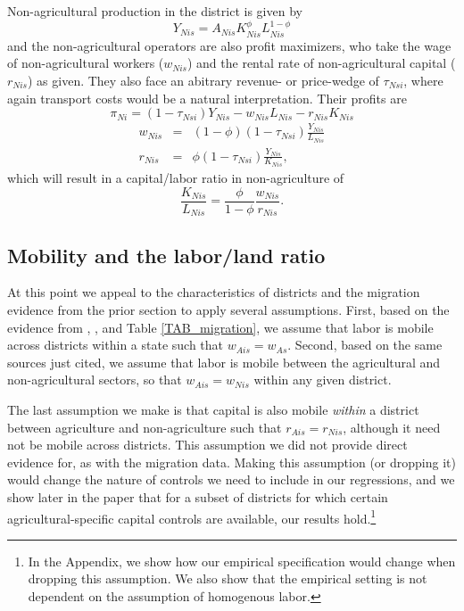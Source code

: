 \documentclass[11pt]{article}
\begin{document}
Non-agricultural production in the district is given by
\begin{equation}
	Y_{Nis} = A_{Nis} K_{Nis}^{\phi}L_{Nis}^{1-\phi} \label{EQ_nonag}
\end{equation}
and the non-agricultural operators are also profit maximizers, who take the wage of non-agricultural workers ($w_{Nis}$) and the rental rate of non-agricultural capital ($r_{Nis}$) as given. They also face an abitrary revenue- or price-wedge of $\tau_{Nsi}$, where again transport costs would be a natural interpretation. Their profits are
\begin{equation}
	\pi_{Ni} = (1-\tau_{Nsi}) Y_{Nis} - w_{Nis} L_{Nis} - r_{Nis} K_{Nis}
\end{equation}
\begin{eqnarray*}
    w_{Nis} &=& (1-\phi)(1-\tau_{Nsi}) \frac{Y_{Nis}}{L_{Nis}} \\ 
    r_{Nis} &=& \phi (1-\tau_{Nsi}) \frac{Y_{Nis}}{K_{Nis}},
\end{eqnarray*}
which will result in a capital/labor ratio in non-agriculture of
\begin{equation}
	\frac{K_{Nis}}{L_{Nis}} = \frac{\phi}{1-\phi} \frac{w_{Nis}}{r_{Nis}}. \label{EQ_KLnon}
\end{equation}

\subsection{Mobility and the labor/land ratio}
At this point we appeal to the characteristics of districts and the migration evidence from the prior section to apply several assumptions. First, based on the evidence from \cite{young2013inequality}, \cite{hklm2017}, and Table \ref{TAB_migration}, we assume that labor is mobile across districts within a state such that $w_{Ais} = w_{As}$. Second, based on the same sources just cited, we assume that labor is mobile between the agricultural and non-agricultural sectors, so that $w_{Ais} = w_{Nis}$ within any given district. 

The last assumption we make is that capital is also mobile \textit{within} a district between agriculture and non-agriculture such that $r_{Ais} = r_{Nis}$, although it need not be mobile across districts. This assumption we did not provide direct evidence for, as with the migration data. Making this assumption (or dropping it) would change the nature of controls we need to include in our regressions, and we show later in the paper that for a subset of districts for which certain agricultural-specific capital controls are available, our results hold.\footnote{In the Appendix, we show how our empirical specification would change when dropping this assumption. We also show that the empirical setting is not dependent on the assumption of homogenous labor.}
\end{document}
